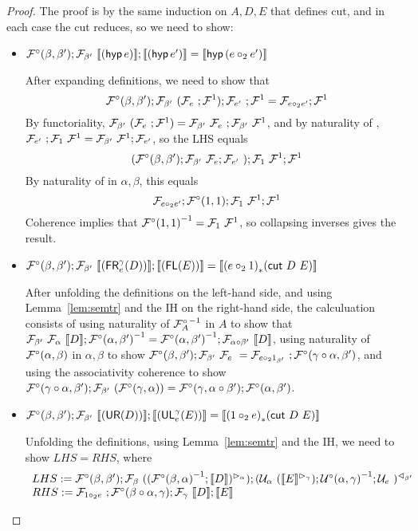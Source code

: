 \documentclass{drl-common/llncs}
\renewcommand{\sem}[1]{\ensuremath{ \llbracket #1 \rrbracket}}
\newcommand{\inv}[1]{\ensuremath{{#1}^{-1}}}
\newcommand\compo[2]{\ensuremath{#1 \circ #2}}
\newcommand\comph[2]{\ensuremath{#1 \mathbin{\circ_2} #2}}
\newcommand\tr[2]{\ensuremath{{{#1}_{*}(#2)}}}
\newcommand\cutsym{\ensuremath{\dsd{cut}}}
\newcommand\cut[2]{\ensuremath{{\cutsym \,\, #1 \,\, #2}}}
\newcommand\hyp[1]{\ensuremath{\dsd{hyp} \, {#1}}}
\newcommand\UL[3]{\ensuremath{\dsd{UL}^{#1}_{#2}(#3)}}
\newcommand\FR[3]{\ensuremath{\dsd{FR}^{#1}_{#2}(#3)}}
\newcommand\FL[1]{\ensuremath{\dsd{FL}(#1)}}
\newcommand\UR[1]{\ensuremath{\dsd{UR}(#1)}}
\begin{document}
\begin{proof}

The proof is by the same induction on $A,D,E$ that defines cut, and in
each case the cut reduces, so we need to show:

\begin{itemize}
\item $\semofcut {(\hyp e)} {(\hyp {e'})} = \sem{\hyp {(\comph{e}{e'})}}$

After expanding definitions, we need to show that
\[
\semFcomp(\beta,\beta');\semF{\beta'}{(\semF{e};\semFone)};\semF{e'};\semFone = \semFo{\comph{e}{e'}};\semFone
\]
By functoriality, $\mathcal{F}_{\beta'} \,\, (\mathcal{F}_{e} \,\, ;{\mathcal{F}^1}) =
\mathcal{F}_{\beta'} \,\, \mathcal{F}_{e} \,\, ;\mathcal{F}_{\beta'} \,\, {\mathcal{F}^1}$, and by naturality of
, $\mathcal{F}_{e'} \,\, ;{\mathcal{F}_{1} \,\, {\mathcal{F}^1}} =
\mathcal{F}_{\beta'} \,\, {\mathcal{F}^1};{\mathcal{F}_{e'}}$,
so the LHS equals
\[
(\mathcal{F}^\circ(\beta,\beta');\mathcal{F}_{\beta'} \,\, {\mathcal{F}_{e}};\mathcal{F}_{e'} \,\, );{\mathcal{F}_{1} \,\, {\mathcal{F}^1}};{\mathcal{F}^1}
\]
By naturality of \semFcomp in $\alpha,\beta$, this equals
\[
\semFo{\comph{e}{e'}};\semFcomp(1,1);{\semF{1}{\semFone}};\semFone
\]
Coherence implies that $\inv{\semFcomp(1,1)} = \semF{1}{\semFone}$, so
collapsing inverses gives the result.  

\item $\semofcut {(\FR \gamma e D)} {(\FL E)} = \sem{ \tr {(\comph{e}{1})} {\cut D E} }$

After unfolding the definitions on the left-hand side, and using
Lemma~\ref{lem:semtr} and the IH on the right-hand side, 
the calculuation consists of using naturality of $\inv{\semFcomp_A}$ in $A$ to
show that $\semF{\beta'}{\semF{\alpha}{\sem
    D}};\inv{\semFcomp(\alpha,\beta')} =
\inv{\semFcomp(\alpha,\beta')};\semF{\compo \alpha \beta'}{\sem{D}}$,
using naturality of $\mathcal{F}^\circ(\alpha,\beta)$ in $\alpha,\beta$ to
show 
$\semFcomp(\beta,\beta');\semF{\beta'}{\semF{e}} =
\semF{\comph{e}{1_{\beta'}}};\semFcomp(\compo{\gamma}{\alpha},\beta')$, 
and using the associativity coherence to show
$\semFcomp(\compo{\gamma}{\alpha},\beta');\semF{\beta'}{(\semFcomp(\gamma,\alpha))}
= \semFcomp(\gamma,\compo{\alpha}{\beta'});\semFcomp(\alpha,\beta')$.

\item $\semofcut {(\UR D)} {(\UL \gamma e E)} = \sem{\tr {(\comph{1}{e})} {\cut D E}}$

Unfolding the definitions, using Lemma~\ref{lem:semtr} and the IH, we
need to show $LHS = RHS$, where
\[
\begin{array}{l}
LHS := \semFcomp(\beta,\beta');\semF{\beta}{(\semltor{(\inv{\semFcomp(\beta,\alpha)};\sem{D})}{\alpha}  )};
\semrtol{(\semU{\alpha}{(\semltor{\sem{E}}{\gamma})};\inv{\semUcomp(\alpha,\gamma)};\semU{e})}{\beta'}\\
RHS := \semF{\comph{1}{e}};\semFcomp(\compo{\beta}{\alpha},\gamma);\semF{\gamma}{\sem{D}};\sem{E}
\end{array}
\]


\end{itemize}
\end{proof}
\end{document}
